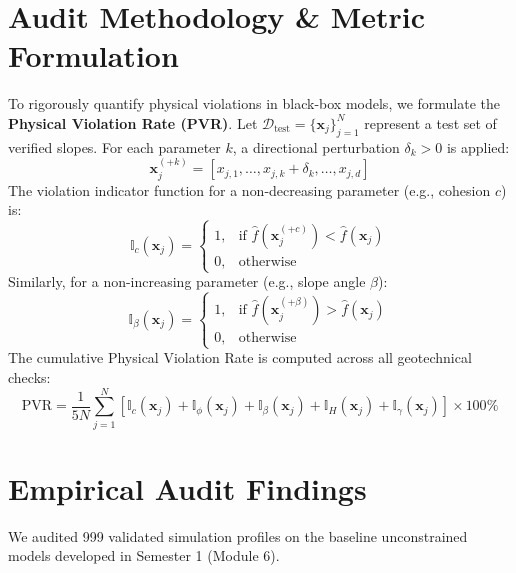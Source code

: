 \documentclass[12pt,a4paper,oneside]{report}
\begin{document}
\section{Audit Methodology \& Metric Formulation}
To rigorously quantify physical violations in black-box models, we formulate the \textbf{Physical Violation Rate (PVR)}. Let $\mathcal{D}_{\text{test}} = \{\mathbf{x}_j\}_{j=1}^{N}$ represent a test set of verified slopes. For each parameter $k$, a directional perturbation $\delta_k > 0$ is applied:
\begin{equation}
  \mathbf{x}_j^{(+k)} = [x_{j,1}, \dots, x_{j,k} + \delta_k, \dots, x_{j,d}]
\end{equation}
The violation indicator function for a non-decreasing parameter (e.g., cohesion $c$) is:
\begin{equation}
  \mathbb{I}_{c}(\mathbf{x}_j) = \begin{cases} 
    1, & \text{if } \hat{f}(\mathbf{x}_j^{(+c)}) < \hat{f}(\mathbf{x}_j) \\
    0, & \text{otherwise}
  \end{cases}
\end{equation}
Similarly, for a non-increasing parameter (e.g., slope angle $\beta$):
\begin{equation}
  \mathbb{I}_{\beta}(\mathbf{x}_j) = \begin{cases} 
    1, & \text{if } \hat{f}(\mathbf{x}_j^{(+\beta)}) > \hat{f}(\mathbf{x}_j) \\
    0, & \text{otherwise}
  \end{cases}
\end{equation}
The cumulative Physical Violation Rate is computed across all geotechnical checks:
\begin{equation}
  \text{PVR} = \frac{1}{5N} \sum_{j=1}^{N} \left[ \mathbb{I}_{c}(\mathbf{x}_j) + \mathbb{I}_{\phi}(\mathbf{x}_j) + \mathbb{I}_{\beta}(\mathbf{x}_j) + \mathbb{I}_{H}(\mathbf{x}_j) + \mathbb{I}_{\gamma}(\mathbf{x}_j) \right] \times 100\%
\end{equation}

\section{Empirical Audit Findings}
We audited 999 validated simulation profiles on the baseline unconstrained models developed in Semester 1 (Module 6).
\end{document}
